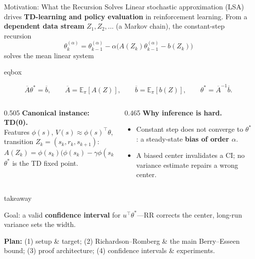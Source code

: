 \documentclass[11pt,aspectratio=169,xcolor=table]{beamer}
\newcommand{\tealaccent}[1]{\textcolor{ThesisTeal}{\bfseries #1}}
\newcommand{\colhead}[1]{\textcolor{ThesisBlue}{\bfseries #1}}
\newcommand{\smallgray}[1]{{\scriptsize\color{ThesisGray}#1}}
\newcommand{\Abar}{\overline{A}}
\newcommand{\bbar}{\overline{b}}
\newenvironment{eqbox}
  {\begin{beamercolorbox}[wd=\linewidth,sep=0.48em,center,rounded=true]{eqbox}%
   \begin{minipage}{0.97\linewidth}\centering}
  {\end{minipage}\end{beamercolorbox}}
\newenvironment{takeawaybox}
  {\begin{beamercolorbox}[wd=\linewidth,sep=0.52em,leftskip=0.25em,rightskip=0.25em,rounded=true]{takeaway}%
   \begin{minipage}{0.96\linewidth}%
   \llap{{\color{ThesisGreen}\rule{2.5pt}{2.6ex}}\hspace{0.5em}}}
  {\end{minipage}\end{beamercolorbox}}
\begin{document}
\begin{frame}[shrink=30]{Motivation: What the Recursion Solves}
\small
Linear stochastic approximation (LSA) drives \tealaccent{TD-learning and policy
evaluation} in reinforcement learning. From a \tealaccent{dependent data stream}
$Z_1,Z_2,\ldots$ (a Markov chain), the constant-step recursion
\[
  \theta_k^{(\alpha)}
  =\theta_{k-1}^{(\alpha)}
   -\alpha\bigl(A(Z_k)\theta_{k-1}^{(\alpha)}-b(Z_k)\bigr)
\]
solves the mean linear system

\begin{eqbox}
\[
  \Abar\theta^*=\bbar,\qquad
  \Abar=\mathbb{E}_{\pi}[A(Z)],\qquad
  \bbar=\mathbb{E}_{\pi}[b(Z)],\qquad
  \theta^*=\Abar^{-1}\bbar.
\]
\end{eqbox}

\vspace{0.35em}
\begin{columns}[T,onlytextwidth]
  \begin{column}{0.505\textwidth}
    \colhead{Canonical instance: TD(0).}\\[-0.2em]
    Features $\phi(s)$, $V(s)\approx\phi(s)^\top\theta$, transition
    $Z_k=(s_k,r_k,s_{k+1})$:
    \[
      A(Z_k)=\phi(s_k)\bigl(\phi(s_k)-\gamma\phi(s_{k+1})\bigr)^\top,
      \qquad b(Z_k)=r_k\phi(s_k);
    \]
    $\theta^*$ is the TD fixed point.
  \end{column}
  \begin{column}{0.465\textwidth}
    \colhead{Why inference is hard.}
    \begin{itemize}
      \item Constant step does not converge to $\theta^*$: a steady-state
      \tealaccent{bias of order $\alpha$}.
      \item A biased center invalidates a CI; no variance estimate repairs a
      wrong center.
    \end{itemize}
  \end{column}
\end{columns}

\vspace{0.2em}
\begin{takeawaybox}
Goal: a valid \textbf{confidence interval} for $u^\top\theta^*$---RR corrects
the center, long-run variance sets the width.
\end{takeawaybox}
\vspace{0.15em}
\smallgray{\textbf{Plan:} (1) setup \& target; (2) Richardson--Romberg \& the
main Berry--Esseen bound; (3) proof architecture; (4) confidence intervals
\& experiments.}
\end{frame}
\end{document}
